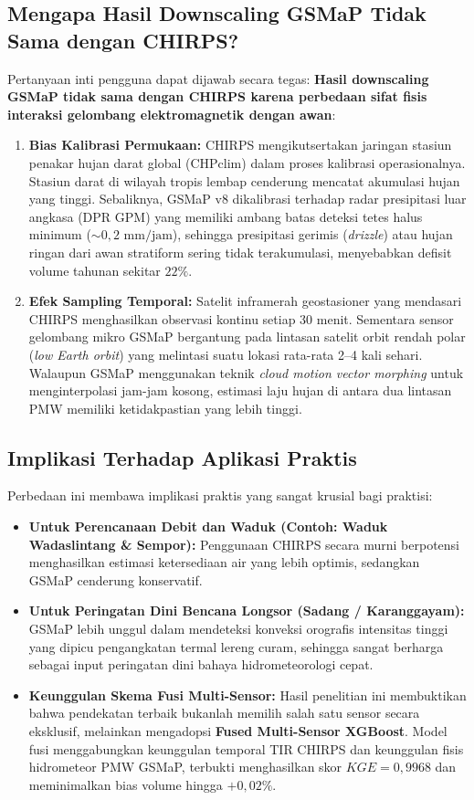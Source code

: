 \documentclass[11pt,a4paper,titlepage]{article}
\begin{document}
\subsection{Mengapa Hasil Downscaling GSMaP Tidak Sama dengan CHIRPS?}
Pertanyaan inti pengguna dapat dijawab secara tegas: \textbf{Hasil downscaling GSMaP tidak sama dengan CHIRPS karena perbedaan sifat fisis interaksi gelombang elektromagnetik dengan awan}:
\begin{enumerate}
    \item \textbf{Bias Kalibrasi Permukaan:} CHIRPS mengikutsertakan jaringan stasiun penakar hujan darat global (CHPclim) dalam proses kalibrasi operasionalnya. Stasiun darat di wilayah tropis lembap cenderung mencatat akumulasi hujan yang tinggi. Sebaliknya, GSMaP v8 dikalibrasi terhadap radar presipitasi luar angkasa (DPR GPM) yang memiliki ambang batas deteksi tetes halus minimum ($\sim 0,2\text{ mm/jam}$), sehingga presipitasi gerimis (\textit{drizzle}) atau hujan ringan dari awan stratiform sering tidak terakumulasi, menyebabkan defisit volume tahunan sekitar $22\%$.
    \item \textbf{Efek Sampling Temporal:} Satelit inframerah geostasioner yang mendasari CHIRPS menghasilkan observasi kontinu setiap 30 menit. Sementara sensor gelombang mikro GSMaP bergantung pada lintasan satelit orbit rendah polar (\textit{low Earth orbit}) yang melintasi suatu lokasi rata-rata 2--4 kali sehari. Walaupun GSMaP menggunakan teknik \textit{cloud motion vector morphing} untuk menginterpolasi jam-jam kosong, estimasi laju hujan di antara dua lintasan PMW memiliki ketidakpastian yang lebih tinggi.
\end{enumerate}

\subsection{Implikasi Terhadap Aplikasi Praktis}
Perbedaan ini membawa implikasi praktis yang sangat krusial bagi praktisi:
\begin{itemize}
    \item \textbf{Untuk Perencanaan Debit dan Waduk (Contoh: Waduk Wadaslintang \& Sempor):} Penggunaan CHIRPS secara murni berpotensi menghasilkan estimasi ketersediaan air yang lebih optimis, sedangkan GSMaP cenderung konservatif.
    \item \textbf{Untuk Peringatan Dini Bencana Longsor (Sadang / Karanggayam):} GSMaP lebih unggul dalam mendeteksi konveksi orografis intensitas tinggi yang dipicu pengangkatan termal lereng curam, sehingga sangat berharga sebagai input peringatan dini bahaya hidrometeorologi cepat.
    \item \textbf{Keunggulan Skema Fusi Multi-Sensor:} Hasil penelitian ini membuktikan bahwa pendekatan terbaik bukanlah memilih salah satu sensor secara eksklusif, melainkan mengadopsi \textbf{Fused Multi-Sensor XGBoost}. Model fusi menggabungkan keunggulan temporal TIR CHIRPS dan keunggulan fisis hidrometeor PMW GSMaP, terbukti menghasilkan skor $KGE = 0,9968$ dan meminimalkan bias volume hingga $+0,02\%$.
\end{itemize}
\end{document}
